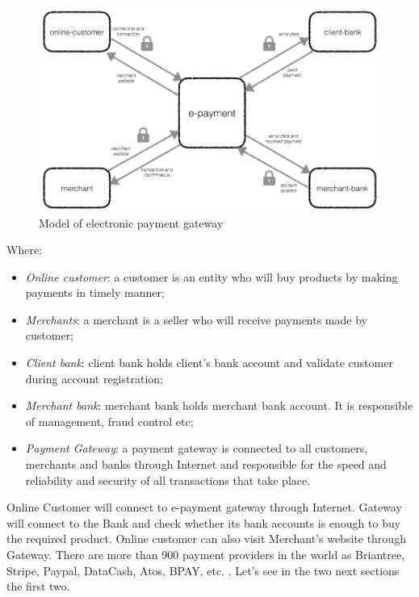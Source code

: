 \begin{figure}[htb]
\centering
\includegraphics[width=1.0\linewidth]{images/chapter2/payment_model.png}\hfill
\caption[Model of electronic payment gateway]{Model of electronic payment gateway}
\label{fig:model_payment_gateway}
\end{figure}
Where:
\begin{itemize}
\item \emph{Online customer}: a customer is an entity who will buy products by
making payments in timely manner;
\item \emph{Merchants}: a merchant is a seller who will receive payments
made by customer;
\item \emph{Client bank}: client bank holds client’s bank account and
validate customer during account registration;
\item \emph{Merchant bank}: merchant bank holds merchant bank account. It is responsible of management, fraud control etc;
\item \emph{Payment Gateway}: a payment gateway is connected to all customers, merchants and banks through Internet and responsible for the speed and reliability and security of all transactions that take place.
\end{itemize}
Online Customer will connect to e-payment gateway through Internet. Gateway will connect to the Bank and check whether its bank accounts is enough to buy the required product. Online customer can also visit Merchant’s website through Gateway.
\newline
There are more than 900 payment providers in the world as Briantree, Stripe, Paypal, DataCash, Atos, BPAY, etc. \cite{payment_service_provider}.
\newline
Let's see in the two next sections the first two.